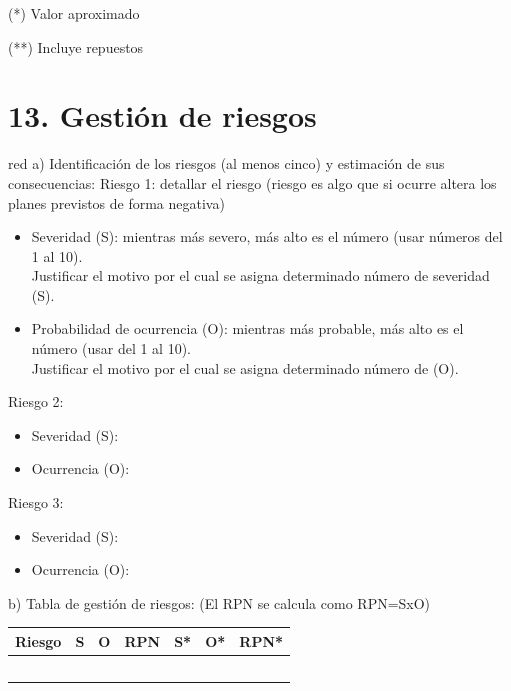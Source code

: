 \documentclass[
11pt, %
codirector, %
]{charter}
\begin{document}
(*) Valor aproximado

(**) Incluye repuestos

\section{13. Gestión de riesgos}
\label{sec:riesgos}

\begin{consigna}{red}
a) Identificación de los riesgos (al menos cinco) y estimación de sus consecuencias:
Riesgo 1: detallar el riesgo (riesgo es algo que si ocurre altera los planes previstos de forma negativa)
\begin{itemize}
	\item Severidad (S): mientras más severo, más alto es el número (usar números del 1 al 10).\\
	Justificar el motivo por el cual se asigna determinado número de severidad (S).
	\item Probabilidad de ocurrencia (O): mientras más probable, más alto es el número (usar del 1 al 10).\\
	Justificar el motivo por el cual se asigna determinado número de (O). 
\end{itemize}   

Riesgo 2:
\begin{itemize}
	\item Severidad (S): 
	\item Ocurrencia (O):
\end{itemize}

Riesgo 3:
\begin{itemize}
	\item Severidad (S): 
	\item Ocurrencia (O):
\end{itemize}


b) Tabla de gestión de riesgos:      (El RPN se calcula como RPN=SxO)

\begin{table}[htpb]
\centering
\begin{tabularx}{\linewidth}{@{}|X|c|c|c|c|c|c|@{}}
\hline
\rowcolor[HTML]{C0C0C0} 
Riesgo & S & O & RPN & S* & O* & RPN* \\ \hline
       &   &   &     &    &    &      \\ \hline
       &   &   &     &    &    &      \\ \hline
       &   &   &     &    &    &      \\ \hline
       &   &   &     &    &    &      \\ \hline
       &   &   &     &    &    &      \\ \hline
\end{tabularx}%
\end{table}


\end{consigna}
\end{document}
